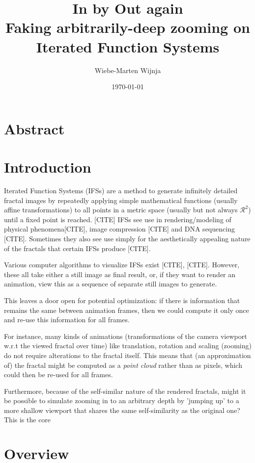 \documentclass[11pt]{article}
\author{Wiebe-Marten Wijnja}
\date{\today}
\title{\Huge In by Out again\\\medskip
\large Faking arbitrarily-deep zooming on Iterated Function Systems}
\begin{document}
\maketitle
\pagebreak
\setcounter{tocdepth}{3}
\tableofcontents

\section{Abstract}
\label{sec:org9a2c21b}

\section{Introduction}
\label{sec:orgd6db77a}

Iterated Function Systems (IFSs) are a method to generate infinitely detailed fractal images 
by repeatedly applying simple mathematical functions (usually affine transformations) to all points in a metric space (usually but not always \(\mathcal{R}^2\)) until a fixed point is reached. [CITE]
IFSs see use in rendering/modeling of physical phenomena[CITE], image compression [CITE] and DNA sequencing [CITE].
Sometimes they also see use simply for the aesthetically appealing nature of the fractals that certain IFSs produce [CITE].

Various computer algorithms to visualize IFSs exist [CITE], [CITE].
However, these all take either a still image as final result, or, if they want to render an animation,
view this as a sequence of separate still images to generate.

This leaves a door open for potential optimization: if there is information that remains the same between animation frames, 
then we could compute it only once and re-use this information for all frames.

For instance, many kinds of animations (transformations of the camera viewport w.r.t the viewed fractal over time) like translation, rotation and scaling (zooming) do not require alterations to the fractal itself.
This means that (an approximation of) the fractal might be computed as a \emph{point cloud} rather than as pixels, which could then be re-used for all frames.

Furthermore, because of the self-similar nature of the rendered fractals, 
might it be possible to simulate zooming in to an arbitrary depth by 'jumping up' to a more shallow viewport 
that shares the same self-similarity as the original one?
This is the core

\section{Overview}
\label{sec:org6b595ce}
\end{document}
